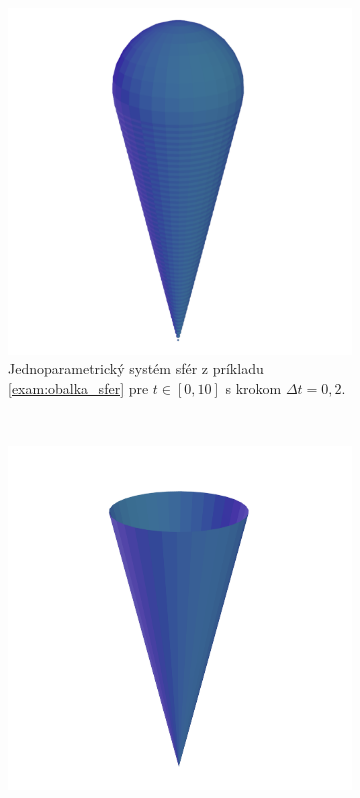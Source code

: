 \begin{example}
\begin{figure}[h]
    \centering
    \begin{subfigure}[t]{0.45\textwidth}
        \centering
        \includegraphics[width=\textwidth]{images/cornetto_spheres.png}
	\caption[Jednoparametrický systém sfér.]{Jednoparametrický systém sfér z príkladu \ref{exam:obalka_sfer} pre $t \in [0,10]$ s krokom $\Delta t = 0,2.$ }
	\label{fig:cornetto}
    \end{subfigure}
    ~
    \begin{subfigure}[t]{0.45\textwidth}
        \centering
       \includegraphics[width=\textwidth]{images/cornetto_en.png}

\end{subfigure}
\end{figure}
\end{example}
